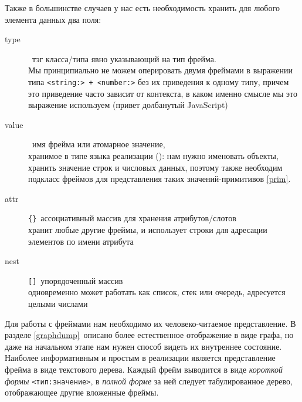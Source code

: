  
Также в большинстве случаев у нас есть необходимость хранить для любого
элемента данных два поля:
\begin{description}

\item[type]\ тэг класса/типа явно указывающий на тип фрейма.\\
Мы принципиально не можем оперировать двумя фреймами в выражении типа
\verb|<string:> + <number:>| без их приведения к одному типу, причем это
приведение часто зависит от контекста, в каком именно смысле мы это выражение
используем (привет долбанутый JavaScript)

\item[value]\ имя фрейма или атомарное значение,\\хранимое в типе языка
реализации (\py): нам нужно именовать объекты, хранить значение строк и числовых
данных, поэтому также необходим подкласс фреймов для представления таких
значений-примитивов \ref{prim}.

\item[attr]\verb|{}|\ ассоциативный массив для хранения атрибутов/слотов\\
хранит любые другие фреймы, и использует строки для адресации элементов по имени
атрибута

\item[nest]\verb|[]|\ упорядоченный массив\\
одновременно может работать как список, стек или очередь, адресуется целыми
числами

\end{description}


Для работы с фреймами нам необходимо их человеко-читаемое представление. В
разделе \ref{graphdump}\ описано более естественное отображение в виде графа, но
даже на начальном этапе нам нужен способ видеть их внутреннее состояние.
Наиболее информативным и простым в реализации является представление фрейма в
виде текстового дерева. Каждый фрейм выводится в виде \emph{короткой формы}
\verb|<тип:значение>|, в \emph{полной форме} за ней следует табулированное
дерево, отображающее другие вложенные фреймы.

\smallskip
{}

